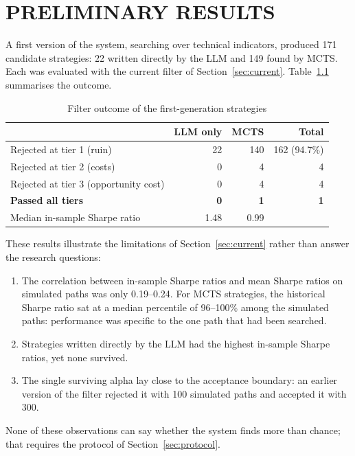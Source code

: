 \documentclass[12pt,a4paper,oneside]{book}
\theoremstyle{definition}
\begin{document}
\chapter{PRELIMINARY RESULTS}
\label{ch4}

A first version of the system, searching over technical indicators, produced 171 candidate strategies: 22 written directly by the LLM and 149 found by MCTS. Each was evaluated with the current filter of Section~\ref{sec:current}. Table~\ref{tab:prelim} summarises the outcome.

\begin{table}[H]
\centering
\caption{Filter outcome of the first-generation strategies}
\label{tab:prelim}
\begin{tabular}{lrrr}
\toprule
 & \textbf{LLM only} & \textbf{MCTS} & \textbf{Total} \\
\midrule
Rejected at tier 1 (ruin) & 22 & 140 & 162 (94.7\%) \\
Rejected at tier 2 (costs) & 0 & 4 & 4 \\
Rejected at tier 3 (opportunity cost) & 0 & 4 & 4 \\
\textbf{Passed all tiers} & \textbf{0} & \textbf{1} & \textbf{1} \\
\midrule
Median in-sample Sharpe ratio & 1.48 & 0.99 & \\
\bottomrule
\end{tabular}
\end{table}

These results illustrate the limitations of Section~\ref{sec:current} rather than answer the research questions:
\begin{enumerate}
  \item The correlation between in-sample Sharpe ratios and mean Sharpe ratios on simulated paths was only 0.19--0.24. For MCTS strategies, the historical Sharpe ratio sat at a median percentile of 96--100\% among the simulated paths: performance was specific to the one path that had been searched.
  \item Strategies written directly by the LLM had the highest in-sample Sharpe ratios, yet none survived.
  \item The single surviving alpha lay close to the acceptance boundary: an earlier version of the filter rejected it with 100 simulated paths and accepted it with 300.
\end{enumerate}
None of these observations can say whether the system finds more than chance; that requires the protocol of Section~\ref{sec:protocol}.
\end{document}
